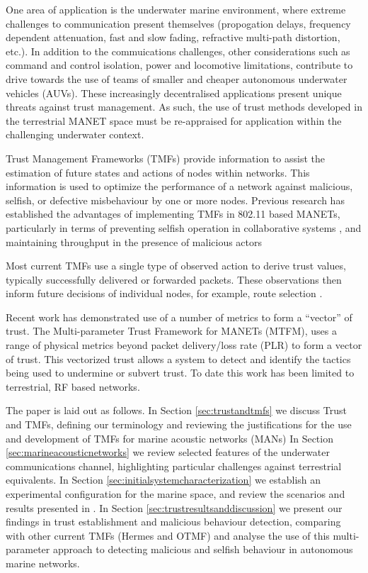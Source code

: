 \documentclass[conference]{IEEEtran}
\begin{document}
One area of application is the underwater marine environment, where extreme challenges to communication present themselves (propogation delays, frequency dependent attenuation, fast and slow fading, refractive multi-path distortion, etc.).
In addition to the commuications challenges, other considerations such as command and control isolation, power and locomotive limitations, contribute to drive towards the use of teams of smaller and cheaper autonomous underwater vehicles (AUVs). 
These increasingly decentralised applications present unique threats against trust management\cite{Caiti2011}.
As such, the use of trust methods developed in the terrestrial MANET space must be re-appraised for application within the challenging underwater context.

Trust Management Frameworks (TMFs) provide information to assist the estimation of future states and actions of nodes within networks.
This information is used to optimize the performance of a network against malicious, selfish, or defective misbehaviour by one or more nodes.
Previous research has established the advantages of implementing TMFs in 802.11 based MANETs, particularly in terms of preventing selfish operation in collaborative systems \cite{Li2007}, and maintaining throughput in the presence of malicious actors \cite{Buchegger2002}

Most current TMFs use a single type of observed action to derive trust values, typically successfully delivered or forwarded packets. 
These observations then inform future decisions of individual nodes, for example, route selection \cite{Li2008}.

Recent work has demonstrated use of a number of metrics to form a ``vector'' of trust.
The Multi-parameter Trust Framework for MANETs (MTFM)\cite{Guo11}, uses a range of physical metrics beyond packet delivery/loss rate (PLR) to form a vector of trust.
This vectorized trust allows a system to detect and identify the tactics being used to undermine or subvert trust.
To date this work has been limited to terrestrial, RF based networks. 

The paper is laid out as follows.
In Section \ref{sec:trustandtmfs} we discuss Trust and TMFs, defining our terminology and reviewing the justifications for the use and development of TMFs for marine acoustic networks (MANs)
In Section \ref{sec:marineacousticnetworks} we review selected features of the underwater communications channel, highlighting particular challenges against terrestrial equivalents.
In Section \ref{sec:initialsystemcharacterization} we establish an experimental configuration for the marine space, and review the scenarios and results presented in \cite{Guo11}.
In Section \ref{sec:trustresultsanddiscussion} we present our findings in trust establishment and malicious behaviour detection, comparing with other current TMFs (Hermes and OTMF) and analyse the use of this multi-parameter approach to detecting malicious and selfish behaviour in autonomous marine networks.
\end{document}
